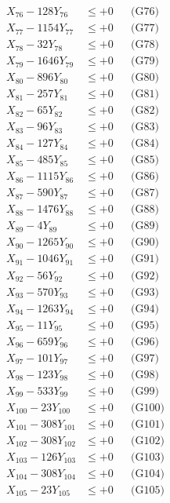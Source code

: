 \documentclass[a4paper,10pt]{article}
\begin{document}
{\begin{align}
X_{76} - 128Y_{76} &\leq +0 && \text{(G76)} \\
X_{77} - 1154Y_{77} &\leq +0 && \text{(G77)} \\
X_{78} - 32Y_{78} &\leq +0 && \text{(G78)} \\
X_{79} - 1646Y_{79} &\leq +0 && \text{(G79)} \\
X_{80} - 896Y_{80} &\leq +0 && \text{(G80)} \\
\allowbreak
X_{81} - 257Y_{81} &\leq +0 && \text{(G81)} \\
X_{82} - 65Y_{82} &\leq +0 && \text{(G82)} \\
X_{83} - 96Y_{83} &\leq +0 && \text{(G83)} \\
X_{84} - 127Y_{84} &\leq +0 && \text{(G84)} \\
X_{85} - 485Y_{85} &\leq +0 && \text{(G85)} \\
X_{86} - 1115Y_{86} &\leq +0 && \text{(G86)} \\
X_{87} - 590Y_{87} &\leq +0 && \text{(G87)} \\
X_{88} - 1476Y_{88} &\leq +0 && \text{(G88)} \\
X_{89} - 4Y_{89} &\leq +0 && \text{(G89)} \\
X_{90} - 1265Y_{90} &\leq +0 && \text{(G90)} \\
\allowbreak
X_{91} - 1046Y_{91} &\leq +0 && \text{(G91)} \\
X_{92} - 56Y_{92} &\leq +0 && \text{(G92)} \\
X_{93} - 570Y_{93} &\leq +0 && \text{(G93)} \\
X_{94} - 1263Y_{94} &\leq +0 && \text{(G94)} \\
X_{95} - 11Y_{95} &\leq +0 && \text{(G95)} \\
X_{96} - 659Y_{96} &\leq +0 && \text{(G96)} \\
X_{97} - 101Y_{97} &\leq +0 && \text{(G97)} \\
X_{98} - 123Y_{98} &\leq +0 && \text{(G98)} \\
X_{99} - 533Y_{99} &\leq +0 && \text{(G99)} \\
X_{100} - 23Y_{100} &\leq +0 && \text{(G100)} \\
\allowbreak
X_{101} - 308Y_{101} &\leq +0 && \text{(G101)} \\
X_{102} - 308Y_{102} &\leq +0 && \text{(G102)} \\
X_{103} - 126Y_{103} &\leq +0 && \text{(G103)} \\
X_{104} - 308Y_{104} &\leq +0 && \text{(G104)} \\
X_{105} - 23Y_{105} &\leq +0 && \text{(G105)} \\

\end{align}}
\end{document}
